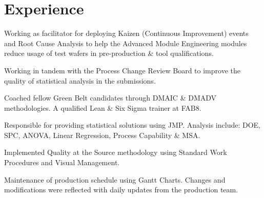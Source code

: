 \documentclass[]{bigfatnoob-resume}
\begin{document}
\hfill
\begin{minipage}[t]{0.66\textwidth} 


\section{Experience}

\vspace{\topsep} %
\begin{tightemize}
\item Working as facilitator for deploying {\ibf Kaizen} (Continuous Improvement) events and {\ibf R}oot {\ibf C}ause {\ibf A}nalysis to help the {\ibf A}dvanced {\ibf M}odule {\ibf E}ngineering modules reduce usage of test wafers in pre-production \& tool qualifications.
\item Working in tandem with the {\ibf Process Change Review Board} to improve the quality of statistical analysis in the submissions.
\item Coached fellow Green Belt candidates through {\ibf DMAIC} \& {\ibf DMADV} methodologies. A qualified {\ibf Lean} \& {\ibf Six Sigma} trainer at {\ibf FAB8}.
\item Responsible for providing statistical solutions using {\ibf JMP}. Analysis  include:  DOE, SPC, ANOVA, Linear Regression, Process Capability \& MSA.
\end{tightemize}
\sectionsep

\begin{tightemize}
\item Implemented {\ibf Quality at the Source} methodology using Standard Work Procedures and Visual Management.
\item Maintenance of production schedule using {\ibf Gantt Charts}. Changes and modifications were reflected with daily updates from the production team.
\end{tightemize}
\sectionsep



\end{minipage}
\end{document}

